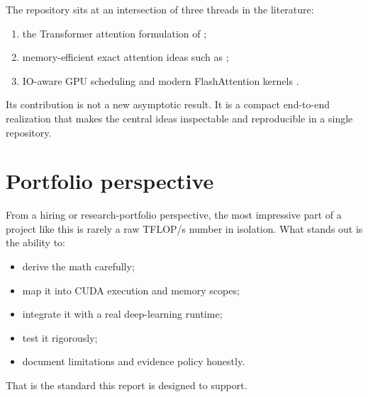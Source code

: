 The repository sits at an intersection of three threads in the literature:
\begin{enumerate}
  \item the Transformer attention formulation of \citet{vaswani2017attention};
  \item memory-efficient exact attention ideas such as \citet{rabe2021selfattention};
  \item IO-aware GPU scheduling and modern FlashAttention kernels \citep{dao2022flashattention,dao2024flashattention2,shah2024flashattention3}.
\end{enumerate}
Its contribution is not a new asymptotic result. It is a compact end-to-end realization that makes the central ideas inspectable and reproducible in a single repository.

\section{Portfolio perspective}

From a hiring or research-portfolio perspective, the most impressive part of a project like this is rarely a raw TFLOP/s number in isolation. What stands out is the ability to:
\begin{itemize}
  \item derive the math carefully;
  \item map it into CUDA execution and memory scopes;
  \item integrate it with a real deep-learning runtime;
  \item test it rigorously;
  \item document limitations and evidence policy honestly.
\end{itemize}
That is the standard this report is designed to support.
